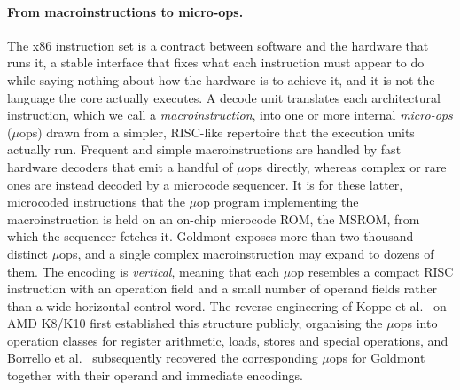 \paragraph{From macroinstructions to micro-ops.}
The x86 instruction set is a contract between software and the hardware that
runs it, a stable interface that fixes what each instruction must appear to do
while saying nothing about how the hardware is to achieve it, and it is not the
language the core actually executes. A decode unit translates each architectural instruction, which we
call a \emph{macroinstruction}, into one or more internal \emph{micro-ops}
($\mu$ops) drawn from a simpler, RISC-like repertoire that the execution units
actually run. Frequent and simple macroinstructions are handled by fast
hardware decoders that emit a handful of $\mu$ops directly, whereas complex or
rare ones are instead decoded by a microcode sequencer. It is for these latter,
microcoded instructions that the $\mu$op program implementing the
macroinstruction is held on an on-chip microcode ROM, the MSROM, from which the
sequencer fetches it. Goldmont exposes more
than two thousand distinct $\mu$ops, and a single complex macroinstruction may
expand to dozens of them. The encoding is \emph{vertical}, meaning that each
$\mu$op resembles a compact RISC instruction with an operation field and a
small number of operand fields rather than a wide horizontal control word. The
reverse engineering of Koppe et al.\ \cite{koppeReverseEngineeringX862017} on
AMD K8/K10 first established this structure publicly, organising the $\mu$ops
into operation classes for register arithmetic, loads, stores and special
operations, and Borrello et al.\ \cite{borrelloCustomProcessingUnitReverseEngineering2023}
subsequently recovered the corresponding $\mu$ops for Goldmont together with
their operand and immediate encodings.

